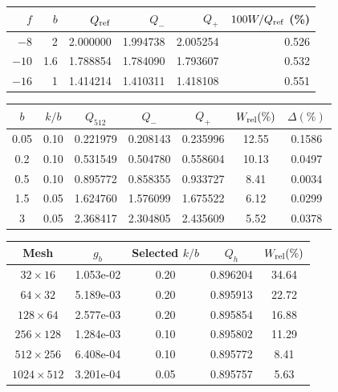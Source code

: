 \begin{tabular}{rrrrrr}\toprule
$f$ & $b$ & $Q_{\rm ref}$ & $Q_-$ & $Q_+$ & $100W/Q_{\rm ref}$ (\%)\\\midrule
$-8$ & 2 & 2.000000 & 1.994738 & 2.005254 & 0.526 \\
$-10$ & 1.6 & 1.788854 & 1.784090 & 1.793607 & 0.532 \\
$-16$ & 1 & 1.414214 & 1.410311 & 1.418108 & 0.551 \\
\bottomrule\end{tabular}

\begin{tabular}{ccccccc}\toprule
$b$ & $k/b$ & $Q_{512}$ & $Q_-$ & $Q_+$ & $W_{\rm rel}(\%)$ & $\Delta(\%)$\\\midrule
0.05 & 0.10 & 0.221979 & 0.208143 & 0.235996 & 12.55 & 0.1586 \\
0.2 & 0.10 & 0.531549 & 0.504780 & 0.558604 & 10.13 & 0.0497 \\
0.5 & 0.10 & 0.895772 & 0.858355 & 0.933727 & 8.41 & 0.0034 \\
1.5 & 0.05 & 1.624760 & 1.576099 & 1.675522 & 6.12 & 0.0299 \\
3 & 0.05 & 2.368417 & 2.304805 & 2.435609 & 5.52 & 0.0378 \\
\bottomrule\end{tabular}

\begin{tabular}{ccccc}\toprule
Mesh & $g_b$ & Selected $k/b$ & $Q_h$ & $W_{\rm rel}(\%)$\\\midrule
$32\times16$ & 1.053e-02 & 0.20 & 0.896204 & 34.64 \\
$64\times32$ & 5.189e-03 & 0.20 & 0.895913 & 22.72 \\
$128\times64$ & 2.577e-03 & 0.20 & 0.895854 & 16.88 \\
$256\times128$ & 1.284e-03 & 0.10 & 0.895802 & 11.29 \\
$512\times256$ & 6.408e-04 & 0.10 & 0.895772 & 8.41 \\
$1024\times512$ & 3.201e-04 & 0.05 & 0.895757 & 5.63 \\
\bottomrule\end{tabular}

